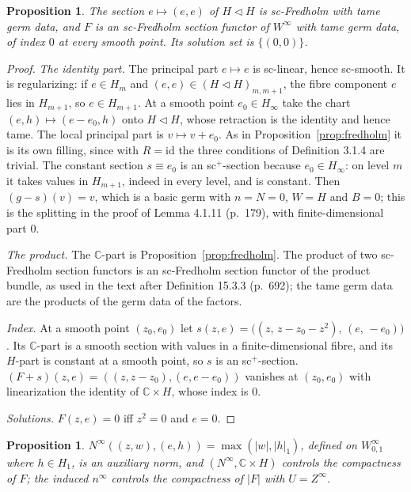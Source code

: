 \documentclass[11pt,a4paper]{article}
\theoremstyle{plain}
\newtheorem{proposition}[theorem]{Proposition}
\theoremstyle{definition}
\theoremstyle{remark}
\newcommand{\C}{\mathbb{C}}
\newcommand{\abs}[1]{\lvert #1\rvert}
\newcommand{\id}{\mathrm{id}}
\begin{document}
\begin{proposition}\label{prop:inffredholm}
The section $e\mapsto(e,e)$ of $H\triangleleft H$ is sc-Fredholm with tame germ data, and $F$ is an
sc-Fredholm section functor of $W^\infty$ with tame germ data, of index $0$ at every smooth point. Its
solution set is $\{(0,0)\}$.
\end{proposition}

\begin{proof}
\emph{The identity part.} The principal part $e\mapsto e$ is sc-linear, hence sc-smooth. It is
regularizing: if $e\in H_m$ and $(e,e)\in(H\triangleleft H)_{m,m+1}$, the fibre component $e$ lies in
$H_{m+1}$, so $e\in H_{m+1}$. At a smooth point $e_0\in H_\infty$ take the chart
$(e,h)\mapsto(e-e_0,h)$ onto $H\triangleleft H$, whose retraction is the identity and hence tame. The
local principal part is $v\mapsto v+e_0$. As in Proposition~\ref{prop:fredholm} it is its own filling,
since with $R=\id$ the three conditions of Definition 3.1.4 are trivial. The constant section
$s\equiv e_0$ is an sc$^+$-section because $e_0\in H_\infty$: on level $m$ it takes values in $H_{m+1}$,
indeed in every level, and is constant. Then $(g-s)(v)=v$, which is a basic germ with $n=N=0$, $W=H$
and $B=0$; this is the splitting in the proof of Lemma 4.1.11 (p.~179), with finite-dimensional
part $0$.

\emph{The product.} The $\C$-part is Proposition~\ref{prop:fredholm}. The product of two sc-Fredholm
section functors is an sc-Fredholm section functor of the product bundle, as used in the text after
Definition 15.3.3 (p.~692); the tame germ data are the products of the germ data of the factors.

\emph{Index.} At a smooth point $(z_0,e_0)$ let
$s(z,e)=\bigl((z,\,z-z_0-z^2),\,(e,\,-e_0)\bigr)$. Its $\C$-part is a smooth section with values in a
finite-dimensional fibre, and its $H$-part is constant at a smooth point, so $s$ is an sc$^+$-section.
$(F+s)(z,e)=((z,z-z_0),(e,e-e_0))$ vanishes at $(z_0,e_0)$ with linearization the identity of
$\C\times H$, whose index is $0$.

\emph{Solutions.} $F(z,e)=0$ iff $z^2=0$ and $e=0$.
\end{proof}

\begin{proposition}\label{prop:infnorm}
$N^\infty((z,w),(e,h))=\max(\abs w,\abs h_1)$, defined on $W^\infty_{0,1}$ where $h\in H_1$, is an
auxiliary norm, and $(N^\infty,\C\times H)$ controls the compactness of $F$; the induced $n^\infty$
controls the compactness of $\abs F$ with $U=Z^\infty$.
\end{proposition}
\end{document}
